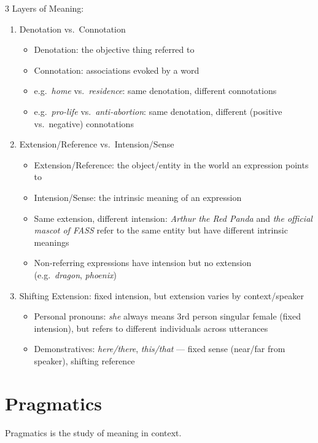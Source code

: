\documentclass[12pt, a4paper]{article}
\begin{document}
\begin{multicols*}{3}
\colbreak
Layers of Meaning:
\begin{enumerate}[\roman*.]
  \item Denotation vs.\ Connotation
    \begin{itemize}[leftmargin=*]\vspace{3pt}
      \item Denotation: the objective thing referred to
      \item Connotation: associations evoked by a word
      \item e.g.\ \textit{home} vs.\ \textit{residence}: same denotation, different connotations
      \item e.g.\ \textit{pro-life} vs.\ \textit{anti-abortion}: same denotation, different (positive vs.\ negative) connotations
    \end{itemize}
  \item Extension/Reference vs.\ Intension/Sense
    \begin{itemize}[leftmargin=*]\vspace{3pt}
      \item Extension/Reference: the object/entity in the world an expression points to
      \item Intension/Sense: the intrinsic meaning of an expression
      \item Same extension, different intension: \textit{Arthur the Red Panda} and \textit{the official mascot of FASS} refer to the same entity but have different intrinsic meanings
      \item Non-referring expressions have intension but no extension\\(e.g.\ \textit{dragon}, \textit{phoenix})
    \end{itemize}
  \item Shifting Extension: fixed intension, but extension varies by context/speaker
    \begin{itemize}[leftmargin=*]\vspace{3pt}
      \item Personal pronouns: \textit{she} always means 3rd person singular female (fixed intension), but refers to different individuals across utterances
      \item Demonstratives: \textit{here/there}, \textit{this/that} --- fixed sense (near/far from speaker), shifting reference
    \end{itemize}
\end{enumerate}

\colbreak
\colbreak
\section{Pragmatics}
Pragmatics is the study of meaning in context.


\end{multicols*}
\end{document}
